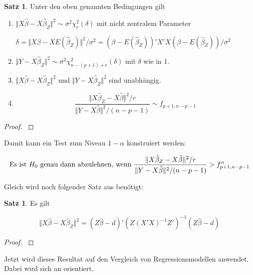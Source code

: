 \documentclass[12pt,a4paper]{article}
\theoremstyle{definition}
\theoremstyle{definition}
\newtheorem{Satz}[Definition]{Satz}
\theoremstyle{definition}
\theoremstyle{definition}
\begin{document}
\begin{Satz}
Unter den oben genannten Bedingungen gilt
\begin{enumerate}
\item $\Vert X \hat{\beta} - X\hat{\beta}_Z \Vert^2  \sim \sigma^2 \chi_r^2(\delta)$ mit nicht zentralem Parameter 

$\delta = \Vert X \beta - X E(\hat{\beta}_Z) \Vert^2 / \sigma^2 = (\beta - E(\hat{\beta}_Z))' X'X (\beta - E(\hat{\beta}_Z)) / \sigma^2$
\item $\Vert Y - X \hat{\beta}_Z \Vert^2  \sim \sigma^2 \chi_{n-(p+1)+r}^2(\delta)$ mit $\delta$ wie in 1.
\item $\Vert X \hat{\beta} - X\hat{\beta}_Z \Vert^2$ und $\Vert Y - X \hat{\beta}_Z \Vert^2$ sind unabhängig.
\item \begin{equation*}
\frac{\Vert X \hat{\beta}_Z - X\hat{\beta} \Vert^2 / r}{\Vert Y - X \hat{\beta} \Vert^2 / (n-p-1)} \sim f_{p+1,n-p-1}
\end{equation*}
\end{enumerate}
\end{Satz}

\begin{proof}
\cite[11]{Liu64}
\end{proof}

Damit kann ein Test zum Niveau $1-\alpha$ konstruiert werden:

\begin{equation}
\textnormal{Es ist }  H_0 \textnormal{ genau dann abzulehnen, wenn } \frac{\Vert X \hat{\beta}_Z - X\hat{\beta} \Vert^2 / r}{\Vert Y - X \hat{\beta} \Vert^2 / (n-p-1)} > f_{p+1,n-p-1}^{\alpha} \label{Einschränkung_Test}
\end{equation}

Gleich wird noch folgender Satz aus \cite[13]{Liu64} benötigt:

\begin{Satz}
Es gilt 

\begin{equation*}
\Vert X \hat{\beta} - X \hat{\beta}_Z \Vert^2 = (Z \hat{\beta}-d)'(Z (X'X)^{-1} Z')^{-1} (Z \hat{\beta} - d)
\end{equation*}
\end{Satz}

\begin{proof}
\cite[13]{Liu64}
\end{proof}

Jetzt wird dieses Resultat auf den Vergleich von Regressionsmodellen anwendet. Dabei wird sich an \cite[114]{Liu64} orientiert. 
\end{document}
